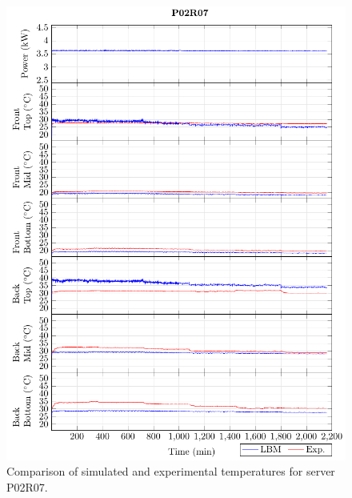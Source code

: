 \begin{figure}[!htb]
\centering
\includegraphics[width=\linewidth]{Plots/P02R07_T.pdf}
\caption{Comparison of simulated and experimental temperatures for server P02R07.}
\label{fig:P02R07_plot}
\end{figure}

\clearpage

